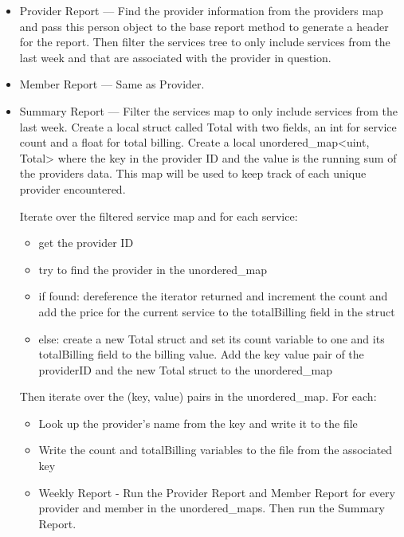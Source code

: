 \documentclass{article}
\begin{document}
\begin{itemize}
   \item Provider Report --- Find the provider information from the providers map and pass this person object to the base report method to generate a header for the report. Then filter the services tree to only include services from the last week and that are associated with the provider in question.
   \item Member Report --- Same as Provider.
   \item Summary Report --- Filter the services map to only include services from the last week. Create a local struct called Total with two fields, an int for service count and a float for total billing. Create a local unordered_map<uint, Total> where the key in the provider ID and the value is the running sum of the providers data. This map will be used to keep track of each unique provider encountered.

      Iterate over the filtered service map and for each service:

\begin{itemize}
   \item get the provider ID
   \item try to find the provider in the unordered_map
   \item if found: dereference the iterator returned and increment the count and add the price for the current service to the totalBilling field in the struct
   \item else: create a new Total struct and set its count variable to one and its totalBilling field to the billing value. Add the key value pair of the providerID and the new Total struct to the unordered_map
\end{itemize}

Then iterate over the (key, value) pairs in the unordered_map. For each:
    
\begin{itemize}
   \item Look up the provider’s name from the key and write it to the file
   \item Write the count and totalBilling variables to the file from the associated key
   \item Weekly Report - Run the Provider Report and Member Report for every provider and member in the unordered_maps. Then run the Summary Report.
\end{itemize}
\end{itemize}
\end{document}
